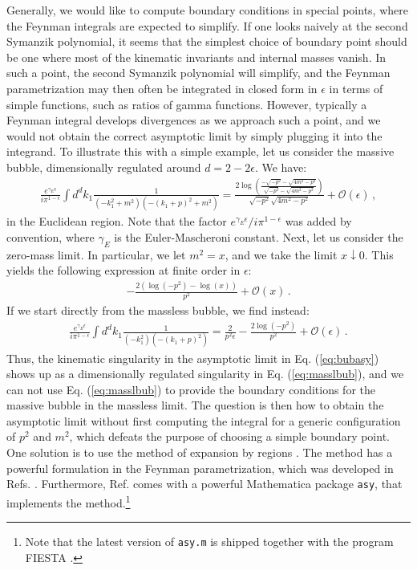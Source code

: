 \documentclass{article}
\begin{document}
Generally, we would like to compute boundary conditions in special points, where the Feynman integrals are expected to simplify. If one looks naively at the second Symanzik polynomial, it seems that the simplest choice of boundary point should be one where most of the kinematic invariants and internal masses vanish. In such a point, the second Symanzik polynomial will simplify, and the Feynman parametrization may then often be integrated in closed form in $\epsilon$ in terms of simple functions, such as ratios of gamma functions. However, typically a Feynman integral develops divergences as we approach such a point, and we would not obtain the correct asymptotic limit by simply plugging it into the integrand. To illustrate this with a simple example, let us consider the massive bubble, dimensionally regulated around $d=2-2\epsilon$. We have:
\begin{align}
\label{eq:masbub}
\frac{e^{\gamma_E \epsilon}}{i \pi^{1-\epsilon}}\int d^{d} k_{1} \frac{1}{(-k_1^2+m^2)(-(k_1+p)^2+m^2)} = \frac{2 \log \left(\frac{-\sqrt{-p^{2}}-\sqrt{4 m^{2}-p^{2}}}{\sqrt{-p^{2}}-\sqrt{4 m^{2}-p^{2}}}\right)}{\sqrt{-p^{2}} \sqrt{4 m^{2}-p^{2}}} + \mathcal{O}(\epsilon)\,,
\end{align}
in the Euclidean region. Note that the factor $e^{\gamma_E \epsilon}/i \pi^{1-\epsilon}$ was added by convention, where $\gamma_E$ is the Euler-Mascheroni constant. Next, let us consider the zero-mass limit. In particular, we let $m^2 = x$, and we take the limit $x \downarrow 0$. This yields the following expression at finite order in $\epsilon$:
\begin{align}
    \label{eq:bubasy}
    -\frac{2\left(\log \left(-p^2\right)-\log (x )\right)}{p^{2}}+\mathcal{O}(x)\,.
\end{align}
If we start directly from the massless bubble, we find instead:
\begin{align}
    \label{eq:masslbub}
    \frac{e^{\gamma_E \epsilon}}{i \pi^{1-\epsilon}}\int d^{d} k_{1} \frac{1}{(-k_1^2)(-(k_1+p)^2)} = \frac{2}{p^{2} \epsilon}-\frac{2 \log \left(-p^{2}\right)}{p^{2}}+\mathcal{O}(\epsilon)\,.
\end{align}
Thus, the kinematic singularity in the asymptotic limit in Eq. (\ref{eq:bubasy}) shows up as a dimensionally regulated singularity in Eq. (\ref{eq:masslbub}), and we can not use Eq. (\ref{eq:masslbub}) to provide the boundary conditions for the massive bubble in the massless limit. The question is then how to obtain the asymptotic limit without first computing the integral for a generic configuration of $p^2$ and $m^2$, which defeats the purpose of choosing a simple boundary point. One solution is to use the method of expansion by regions \cite{Beneke:1997zp}. The method has a powerful formulation in the Feynman parametrization, which was developed in Refs. \cite{Pak:2010pt, Jantzen:2012mw}. Furthermore, Ref. \cite{Jantzen:2012mw} comes with a powerful Mathematica package \texttt{asy}, that implements the method.\footnote{Note that the latest version of \texttt{asy.m} is shipped together with the program FIESTA \cite{Smirnov:2015mct}.}
\end{document}

